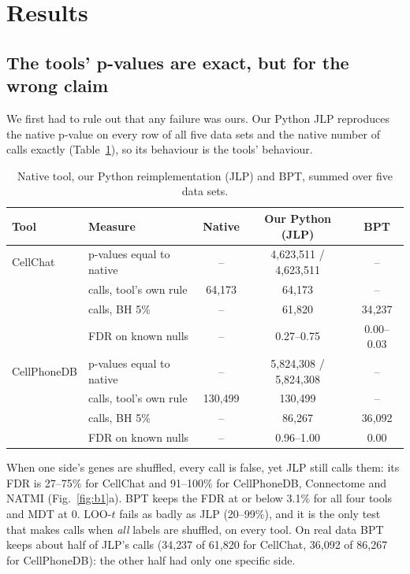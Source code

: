 \documentclass[11pt]{article}
\newcommand{\JLP}{JLP}
\newcommand{\BPT}{BPT}
\newcommand{\MDT}{MDT}
\newcommand{\LOO}{LOO-$t$}
\begin{document}
\section{Results}

\subsection{The tools' p-values are exact, but for the wrong claim}

We first had to rule out that any failure was ours. Our Python \JLP{} reproduces the native p-value on every row of
all five data sets and the native number of calls exactly (Table~\ref{tab:three}), so its behaviour is the tools'
behaviour.

\begin{table}[H]
\centering\small
\caption{Native tool, our Python reimplementation (\JLP) and \BPT, summed over five data sets.}
\label{tab:three}
\begin{tabular}{@{}llccc@{}}
\toprule
Tool & Measure & Native & Our Python (\JLP) & \BPT\\
\midrule
CellChat & p-values equal to native & -- & 4{,}623{,}511 / 4{,}623{,}511 & --\\
 & calls, tool's own rule & 64{,}173 & 64{,}173 & --\\
 & calls, BH 5\% & -- & 61{,}820 & 34{,}237\\
 & FDR on known nulls & -- & 0.27--0.75 & 0.00--0.03\\
\midrule
CellPhoneDB & p-values equal to native & -- & 5{,}824{,}308 / 5{,}824{,}308 & --\\
 & calls, tool's own rule & 130{,}499 & 130{,}499 & --\\
 & calls, BH 5\% & -- & 86{,}267 & 36{,}092\\
 & FDR on known nulls & -- & 0.96--1.00 & 0.00\\
\bottomrule
\end{tabular}
\end{table}

When one side's genes are shuffled, every call is false, yet \JLP{} still calls them: its FDR is 27--75\% for
CellChat and 91--100\% for CellPhoneDB, Connectome and NATMI (Fig.~\ref{fig:b1}a). \BPT{} keeps the FDR at or below
3.1\% for all four tools and \MDT{} at 0. \LOO{} fails as badly as \JLP{} (20--99\%), and it is the only test that
makes calls when \emph{all} labels are shuffled, on every tool. On real data \BPT{} keeps about half of \JLP's calls
(34{,}237 of 61{,}820 for CellChat, 36{,}092 of 86{,}267 for CellPhoneDB): the other half had only one specific side.
\end{document}
